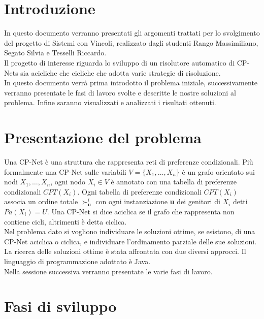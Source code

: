 \documentclass[a4paper,titlepage]{article}
\begin{document}
\tableofcontents

\newpage

\section{Introduzione}
In questo documento verranno presentati gli argomenti trattati per lo svolgimento del progetto di Sistemi con Vincoli, realizzato dagli studenti Rango Massimiliano, Segato Silvia e Tesselli Riccardo.\\Il progetto di interesse riguarda lo sviluppo di un risolutore automatico di CP-Nets sia acicliche che cicliche che adotta varie strategie di risoluzione.\\In questo documento verrà prima introdotto il problema iniziale, successivamente verranno presentate le fasi di lavoro svolte e descritte le nostre soluzioni al problema. Infine saranno visualizzati e analizzati i risultati ottenuti.

\section{Presentazione del problema}
Una CP-Net è una struttura che rappresenta reti di preferenze condizionali. Più formalmente una CP-Net sulle variabili $V = \{X_{1},\dots, X_{n}\}$ è un grafo orientato sui nodi $X_{1},\dots, X_{n}$, ogni nodo $X_{i} \in V$ è annotato con una tabella di preferenze condizionali $CPT(X_{i})$. Ogni tabella di preferenze condizionali $CPT(X_{i})$ associa un ordine totale $\succ^{i}_{\textbf{u}}$ con ogni instanziazione \textbf{u} dei genitori di $X_{i}$ detti $Pa(X_{i}) = U$. Una CP-Net si dice aciclica se il grafo che rappresenta non contiene cicli, altrimenti è detta ciclica.\\
Nel problema dato si vogliono individuare le soluzioni ottime, se esistono, di una CP-Net aciclica o ciclica, e individuare l'ordinamento parziale delle sue soluzioni. La ricerca delle soluzioni ottime è stata affrontata con due diversi approcci. Il linguaggio di programmazione adottato è Java.\\Nella sessione successiva verranno presentate le varie fasi di lavoro.


\section{Fasi di sviluppo}
\end{document}
